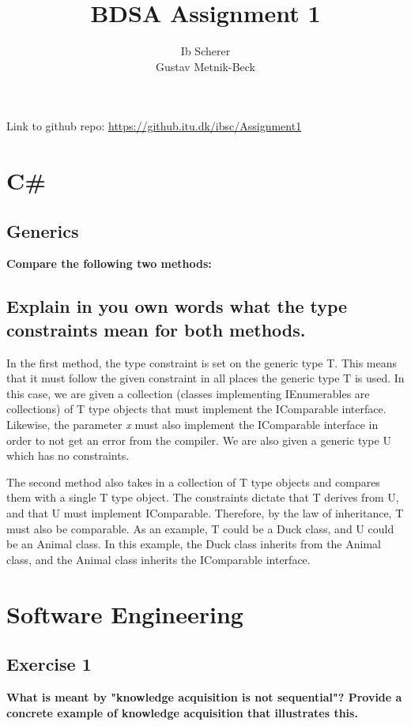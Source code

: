 \documentclass{article}
\title{BDSA Assignment 1}
\author{Ib Scherer\\ Gustav Metnik-Beck}
\begin{document}
\maketitle

\begin{center}
    Link to github repo: \url{https://github.itu.dk/ibsc/Assignment1}
\end{center}

\section*{C\#}
\subsection*{Generics}
\textbf{Compare the following two methods:}
\begin{center}
\end{center}

\subsection*{Explain in you own words what the type constraints mean for both methods.}

In the first method, the type constraint is set on the generic type T. This means that it must follow the given constraint in all places the generic type T is used. 
In this case, we are given a collection (classes implementing IEnumerables are collections) of T type objects that must implement the IComparable interface. Likewise, the parameter \textit{x} must also implement the IComparable interface in order to not get an error from the compiler. We are also given a generic type U which has no constraints.

The second method also takes in a collection of T type objects and compares them with a single T type object. The constraints dictate that T derives from U, and that U must implement IComparable. Therefore, by the law of inheritance, T must also be comparable. As an example, T could be a Duck class, and U could be an Animal class. In this example, the Duck class inherits from the Animal class, and the Animal class inherits the IComparable interface.

\newpage
\section*{Software Engineering}

\subsection*{Exercise 1}
\textbf{What is meant by "knowledge acquisition is not sequential"? Provide a concrete example of knowledge acquisition that illustrates this.}
\end{document}

